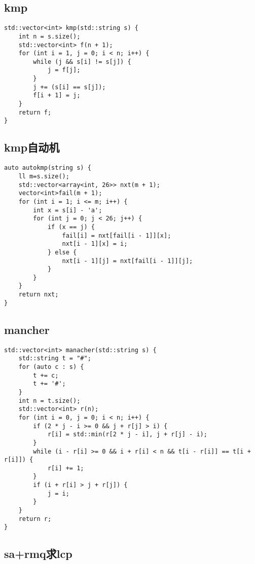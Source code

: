 \documentclass[a4paper,10pt]{article}
\begin{document}
\subsection{kmp}
\thispagestyle{fancy}

\noindent\begin{lstlisting}
std::vector<int> kmp(std::string s) {
    int n = s.size();
    std::vector<int> f(n + 1);
    for (int i = 1, j = 0; i < n; i++) {
        while (j && s[i] != s[j]) {
            j = f[j];
        }
        j += (s[i] == s[j]);
        f[i + 1] = j;
    }
    return f;
}\end{lstlisting}

\subsection{kmp自动机}
\thispagestyle{fancy}

\noindent\begin{lstlisting}
auto autokmp(string s) {
    ll m=s.size();
    std::vector<array<int, 26>> nxt(m + 1);
    vector<int>fail(m + 1);
    for (int i = 1; i <= m; i++) {
        int x = s[i] - 'a';
        for (int j = 0; j < 26; j++) {
            if (x == j) {
                fail[i] = nxt[fail[i - 1]][x];
                nxt[i - 1][x] = i;
            } else {
                nxt[i - 1][j] = nxt[fail[i - 1]][j];
            }
        }
    }
    return nxt;
}\end{lstlisting}

\subsection{mancher}
\thispagestyle{fancy}

\noindent\begin{lstlisting}
std::vector<int> manacher(std::string s) {
    std::string t = "#";
    for (auto c : s) {
        t += c;
        t += '#';
    }
    int n = t.size();
    std::vector<int> r(n);
    for (int i = 0, j = 0; i < n; i++) {
        if (2 * j - i >= 0 && j + r[j] > i) {
            r[i] = std::min(r[2 * j - i], j + r[j] - i);
        }
        while (i - r[i] >= 0 && i + r[i] < n && t[i - r[i]] == t[i + r[i]]) {
            r[i] += 1;
        }
        if (i + r[i] > j + r[j]) {
            j = i;
        }
    }
    return r;
}
\end{lstlisting}

\subsection{sa+rmq求lcp}
\thispagestyle{fancy}
\end{document}
